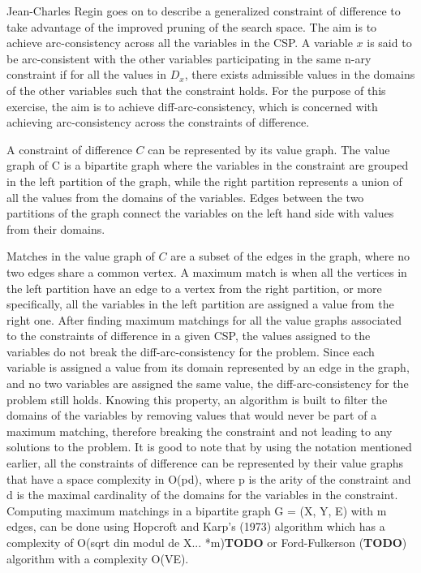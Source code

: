 \documentclass{l4proj}
\begin{document}
\noindent Jean-Charles Regin goes on to describe a generalized constraint of difference to take advantage of the improved pruning of the search space. The aim is to achieve arc-consistency across all the variables in the CSP. A variable $x$ is said to be arc-consistent with the other variables participating in the same n-ary constraint if for all the values in $D_x$, there exists admissible values in the domains of the other variables such that the constraint holds. For the purpose of this exercise, the aim is to achieve diff-arc-consistency, which is concerned with achieving arc-consistency across the constraints of difference.

\noindent A constraint of difference $C$ can be represented by its value graph. The value graph of C is a bipartite graph where the variables in the constraint are grouped in the left partition of the graph, while the right partition represents a union of all the values from the domains of the variables. Edges between the two partitions of the graph connect the variables on the left hand side with values from their domains.

\noindent Matches in the value graph of $C$ are a subset of the edges in the graph, where no two edges share a common vertex. A maximum match is when all the vertices in the left partition have an edge to a vertex from the right partition, or more specifically, all the variables in the left partition are assigned a value from the right one.
After finding maximum matchings for all the value graphs associated to the constraints of difference in a given CSP, the values assigned to the variables do not break the diff-arc-consistency for the problem. Since each variable is assigned a value from its domain represented by an edge in the graph, and no two variables are assigned the same value, the diff-arc-consistency for the problem still holds. Knowing this property, an algorithm is built to filter the domains of the variables by removing values that would never be part of a maximum matching, therefore breaking the constraint and not leading to any solutions to the problem. It is good to note that by using the notation mentioned earlier, all the constraints of difference can be represented by their value graphs that have a space complexity in O(pd), where p is the arity of the constraint and d is the maximal cardinality of the domains for the variables in the constraint. Computing maximum matchings in a bipartite graph G = (X, Y, E) with m edges, can be done using Hopcroft and Karp’s (1973) algorithm which has a complexity of O(sqrt din modul de X... *m)\textbf{TODO}  or Ford-Fulkerson (\textbf{TODO}) algorithm with a complexity O(VE). 
\end{document}
